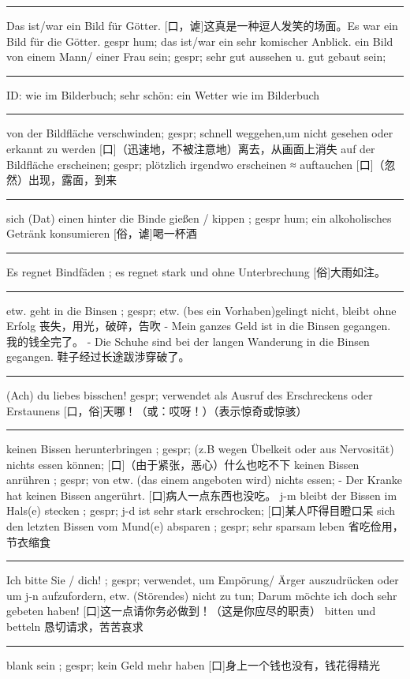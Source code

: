 \noindent\rule{\textwidth}{1pt} 
Das ist/war ein Bild für Götter. [口，谑]这真是一种逗人发笑的场面。Es war ein Bild für die Götter. gespr hum; das ist/war ein sehr komischer Anblick.
ein Bild von einem Mann/ einer Frau sein; gespr; sehr gut aussehen u. gut gebaut sein; 

\noindent\rule{\textwidth}{1pt} 
ID: wie im Bilderbuch; sehr schön: ein Wetter wie im Bilderbuch

\noindent\rule{\textwidth}{1pt} 
von der Bildfläche verschwinden; gespr; schnell weggehen,um nicht gesehen oder erkannt zu werden [口]（迅速地，不被注意地）离去，从画面上消失
auf der Bildfläche erscheinen; gespr; plötzlich irgendwo erscheinen ≈ auftauchen [口]（忽然）出现，露面，到来

\noindent\rule{\textwidth}{1pt} 
sich (Dat) einen hinter die Binde gießen / kippen ; gespr hum; ein alkoholisches Getränk konsumieren [俗，谑]喝一杯酒

\noindent\rule{\textwidth}{1pt} 
Es regnet Bindfäden ; es regnet stark und ohne Unterbrechung [俗]大雨如注。

\noindent\rule{\textwidth}{1pt} 
etw. geht in die Binsen ; gespr; etw. (bes ein Vorhaben)gelingt nicht, bleibt ohne Erfolg 丧失，用光，破碎，告吹
- Mein ganzes Geld ist in die Binsen gegangen. 我的钱全完了。
- Die Schuhe sind bei der langen Wanderung in die Binsen gegangen. 鞋子经过长途跋涉穿破了。

\noindent\rule{\textwidth}{1pt} 
(Ach) du liebes bisschen! gespr; verwendet als Ausruf des Erschreckens oder Erstaunens [口，俗]天哪！（或：哎呀！）（表示惊奇或惊骇）

\noindent\rule{\textwidth}{1pt} 
keinen Bissen herunterbringen ; gespr; (z.B wegen Übelkeit oder aus Nervosität) nichts essen können; [口]（由于紧张，恶心）什么也吃不下
keinen Bissen anrühren ; gespr; von etw. (das einem angeboten wird) nichts essen; 
- Der Kranke hat keinen Bissen angerührt. [口]病人一点东西也没吃。
j-m bleibt der Bissen im Hals(e) stecken ; gespr; j-d ist sehr stark erschrocken; [口]某人吓得目瞪口呆
sich den letzten Bissen vom Mund(e) absparen ; gespr; sehr sparsam leben 省吃俭用，节衣缩食

\noindent\rule{\textwidth}{1pt} 
Ich bitte Sie / dich! ; gespr; verwendet, um Empörung/ Ärger auszudrücken oder um j-n aufzufordern, etw. (Störendes) nicht zu tun;
Darum möchte ich doch sehr gebeten haben! [口]这一点请你务必做到！（这是你应尽的职责）
bitten und betteln 恳切请求，苦苦哀求

\noindent\rule{\textwidth}{1pt} 
blank sein ; gespr; kein Geld mehr haben [口]身上一个钱也没有，钱花得精光

